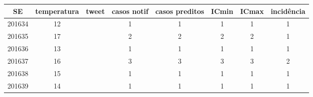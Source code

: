 \begin{tabular}{c|ccccccc}
  \hline
SE & temperatura & tweet & casos notif & casos preditos & ICmin & ICmax & incidência \\ 
  \hline
201634 & 12 &  & 1 & 1 & 1 & 1 & 1 \\ 
  201635 & 17 &  & 2 & 2 & 2 & 2 & 1 \\ 
  201636 & 13 &  & 1 & 1 & 1 & 1 & 1 \\ 
  201637 & 16 &  & 3 & 3 & 3 & 3 & 2 \\ 
  201638 & 15 &  & 1 & 1 & 1 & 1 & 1 \\ 
  201639 & 14 &  & 1 & 1 & 1 & 1 & 1 \\ 
   \hline
\end{tabular}
